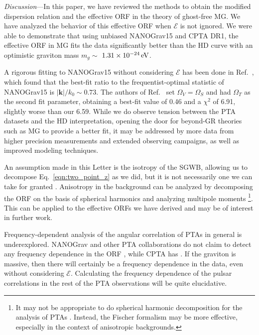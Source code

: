 \documentclass[10pt,prd,twocolumn,aps,nofootinbib,nobibnotes,superscriptaddress,preprintnumbers]{revtex4-2}
\newcommand{\eV}{\,{\rm eV}}
\begin{document}
\textit{Discussion}---In this paper, we have reviewed the methods to obtain the modified dispersion relation and the effective ORF in the theory of ghost-free MG. We have analyzed the behavior of this effective ORF when $\mathcal{E}$ is not ignored. We were able to demonstrate that using unbiased NANOGrav15 and CPTA DR1, the effective ORF in MG fits the data significantly better than the HD curve with an optimistic graviton mass $m_g \sim$ $1.31\times10^{-24} \eV$.

A rigorous fitting to NANOGrav15 without considering $\mathcal{E}$ has been done in Ref.~\cite{Arjona:2024cex}, which found that the best-fit ratio to the frequentist-optimal statistic of NANOGrav15 is $|\boldsymbol{k}|/k_0 \sim 0.73$. The authors of Ref.~\cite{Arjona:2024cex} set $\Omega_V = \Omega_S$ and had $\Omega_T$ as the second fit parameter, obtaining a best‑fit value of 0.46 and a $\chi^2$ of 6.91, slightly worse than our 6.59. While we do observe tension between the PTA datasets and the HD interpretation, opening the door for beyond-GR theories such as MG to provide a better fit, it may be addressed by more data from higher precision measurements and extended observing campaigns, as well as improved modeling techniques. 

An assumption made in this Letter is the isotropy of the SGWB, allowing us to decompose Eq.~\ref{eqn:two_point_z} as we did, but it is not necessarily one we can take for granted \cite{Depta:2024ykq, Bravo:2025csu, Cusin:2025xle, Kuwahara:2024jiz, Li:2024lvt}. Anisotropy in the background can be analyzed by decomposing the ORF on the basis of spherical harmonics and analyzing multipole moments \cite{Allen:2024bnk, Gair:2014rwa}\footnote{It may not be appropriate to do spherical harmonic decomposition for the analysis of PTAs \cite{Ali-Haimoud:2020ozu}. Instead, the Fischer formalism may be more effective, especially in the context of anisotropic backgrounds.}.  
This can be applied to the effective ORFs we have derived and may be of interest in further work. 

Frequency-dependent analysis of the angular correlation of PTAs in general is underexplored. NANOGrav and other PTA collaborations do not claim to detect any frequency dependence in the ORF \cite{Agazie:2023,EPTA:2023sfo,EPTA:2023akd,EPTA:2023fyk, Zic:2023gta,Reardon:2023gzh}, while CPTA has \cite{Xu:2023wog}. If the graviton is massive, then there will certainly be a frequency dependence in the data, even without considering $\mathcal{E}$. Calculating the frequency dependence of the pulsar correlations in the rest of the PTA observations will be quite elucidative. 
\end{document}
